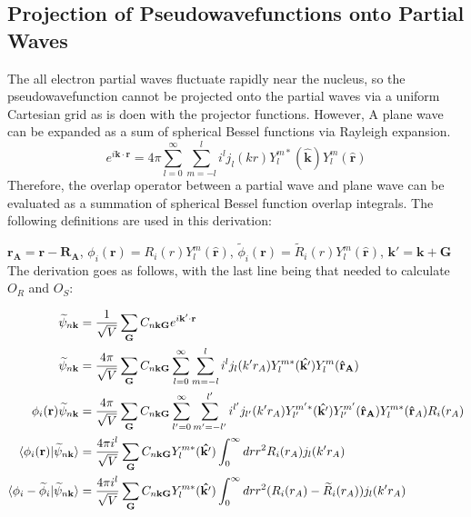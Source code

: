 \documentclass[12pt]{article}
\begin{document}
\subsection{Projection of Pseudowavefunctions onto Partial Waves}

The all electron partial waves fluctuate rapidly near the nucleus,
so the pseudowavefunction cannot be projected onto the partial waves
via a uniform Cartesian grid as is doen with the projector functions.
However, A plane wave can be expanded as a sum of spherical
Bessel functions via Rayleigh expansion.
\begin{equation}
e^{i\mathbf{k} \cdot \mathbf{r}} = 4\pi \sum_{l=0}^{\infty}\sum_{m=-l}^{l}
i^l j_l(kr)Y_l^{m*}(\mathbf{\hat{k}})Y_l^m(\mathbf{\hat{r}})
\label{eq:pwexp}
\end{equation}
Therefore, the overlap operator between a partial wave and plane wave can be evaluated as a summation
of spherical Bessel function overlap integrals. The following definitions are
used in this derivation:

$\mathbf{r_A} = \mathbf{r} - \mathbf{R_A}$, $\phi_i(\mathbf{r})=R_i(r)Y_l^m(\mathbf{\hat{r}})$,
$\widetilde{\phi}_i(\mathbf{r})=\widetilde{R}_i(r)Y_l^m(\mathbf{\hat{r}})$,
$\mathbf{k'}=\mathbf{k}+\mathbf{G}$\\
The derivation goes as follows, with the last line being that needed to 
calculate $O_R$ and $O_S$:

\begin{equation}
\begin{split}
\widetilde{\psi}_{n\mathbf{k}} & =\frac{1}{\sqrt{V}}\sum_{\mathbf{G}}
C_{n\mathbf{k}\mathbf{G}}e^{i\mathbf{k'}\cdot \mathbf{r}}\\
\widetilde{\psi}_{n\mathbf{k}} & =\frac{4\pi}{\sqrt{V}}\sum_{\mathbf{G}}
C_{n\mathbf{k}\mathbf{G}}\sum_{l=0}^{\infty}\sum_{m=-l}^{l}
i^l j_l(k'r_A)Y_l^{m*}(\mathbf{\hat{k'}})Y_l^m(\mathbf{\hat{r}_A})\\
\phi_i(\mathbf{r})\widetilde{\psi}_{n\mathbf{k}} & =\frac{4\pi}{\sqrt{V}}\sum_{\mathbf{G}}
C_{n\mathbf{k}\mathbf{G}}\sum_{l'=0}^{\infty}\sum_{m'=-l'}^{l'}
i^{l'} j_{l'}(k'r_A)Y_{l'}^{m'*}(\mathbf{\hat{k'}})Y_{l'}^{m'}(\mathbf{\hat{r}_A})
Y_l^{m*}(\mathbf{\hat{r}}_A)R_i(r_A)\\
\braket{\phi_i(\mathbf{r})|\widetilde{\psi}_{n\mathbf{k}}} & =
\frac{4\pi i^l}{\sqrt{V}}\sum_{\mathbf{G}} C_{n\mathbf{k}\mathbf{G}}
Y_l^{m*}(\mathbf{\hat{k'}})\int_0^{\infty}drr^2R_i(r_A)j_l(k'r_A)\\
\braket{\phi_i-\widetilde{\phi}_i|\widetilde{\psi}_{n\mathbf{k}}} & =
\frac{4\pi i^l}{\sqrt{V}}\sum_{\mathbf{G}} C_{n\mathbf{k}\mathbf{G}}
Y_l^{m*}(\mathbf{\hat{k'}})\int_0^{\infty}drr^2(R_i(r_A)-\widetilde{R}_i(r_A))j_l(k'r_A)
\end{split}
\end{equation}
\end{document}
